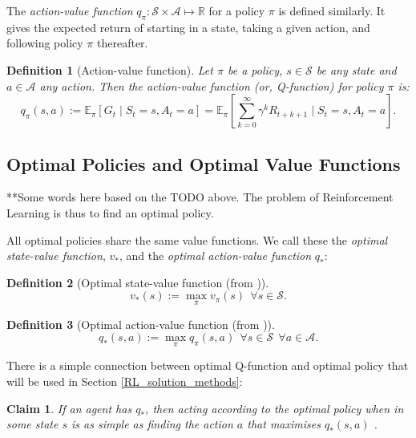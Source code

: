 \documentclass[11pt, a4paper, bibliography=totoc]{report}
\newcommand{\reals}{\mathbb{R}}
\newcommand{\E}[2]{\mathbb{E}_{#1} \left[ #2 \right] }
\newtheorem{claim}{Claim}
\newtheorem{definition}{Definition}
\begin{document}
The \textit{action-value function} $ q_\pi : \mathcal{S} \times \mathcal{A} \mapsto \reals $ for a policy $ \pi $ is defined similarly. It gives the expected return of starting in a state, taking a given action, and following policy $ \pi $ thereafter.
\begin{definition}[Action-value function]
	Let $ \pi $ be a policy, $ s \in \mathcal{S} $ be any state and $ a \in \mathcal{A} $ any action. Then the action-value function (or, Q-function) for policy $ \pi $ is:
	\begin{equation} \label{v_pi}
	q_\pi(s, a) := \E{\pi}{G_t \mid S_t = s, A_t = a} = \E{\pi}{\sum_{k=0}^{\infty} \gamma^k R_{t+k+1} \mid S_t = s, A_t = a}.
	\end{equation}
\end{definition}

\subsection{Optimal Policies and Optimal Value Functions} \label{optimal_policy_value_functions}
**Some words here based on the TODO above.
The problem of Reinforcement Learning is thus to find an optimal policy.

All optimal policies share the same value functions. We call these the \textit{optimal state-value function}, $ v_* $, and the \textit{optimal action-value function} $ q_* $:
\begin{definition}[Optimal state-value function (from {\cite[p.~62]{Sutton2018}})]
	$$ v_*(s)  := \max_\pi v_\pi(s) ~~ \forall s \in \mathcal{S} .$$
\end{definition}
\begin{definition}[Optimal action-value function (from {\cite[p.~63]{Sutton2018}})]
	$$ q_*(s,a)  := \max_\pi q_\pi(s,a) ~~ \forall s \in \mathcal{S} ~~ \forall a \in \mathcal{A} .$$
\end{definition}

There is a simple connection between optimal Q-function and optimal policy that will be used in Section \ref{RL_solution_methods}:
\begin{claim} \label{Q_claim}
	If an agent has $ q_* $, then acting according to the optimal policy when in some state $ s $ is as simple as finding the action $ a $ that maximises $ q_*(s,a) $ \cite[p.~64]{Sutton2018}.
\end{claim}
\end{document}
